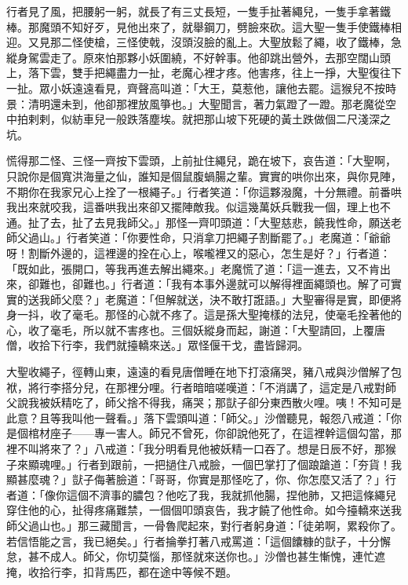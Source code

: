 行者見了風，把腰躬一躬，就長了有三丈長短，一隻手扯著繩兒，一隻手拿著鐵棒。那魔頭不知好歹，見他出來了，就舉鋼刀，劈臉來砍。這大聖一隻手使鐵棒相迎。又見那二怪使槍，三怪使戟，沒頭沒臉的亂上。大聖放鬆了繩，收了鐵棒，急縱身駕雲走了。原來怕那夥小妖圍繞，不好幹事。他卻跳出營外，去那空闊山頭上，落下雲，雙手把繩盡力一扯，老魔心裡才疼。他害疼，往上一掙，大聖復往下一扯。眾小妖遠遠看見，齊聲高叫道：「大王，莫惹他，讓他去罷。這猴兒不按時景：清明還未到，他卻那裡放風箏也。」大聖聞言，著力氣蹬了一蹬。那老魔從空中拍剌剌，似紡車兒一般跌落塵埃。就把那山坡下死硬的黃土跌做個二尺淺深之坑。

慌得那二怪、三怪一齊按下雲頭，上前扯住繩兒，跪在坡下，哀告道：「大聖啊，只說你是個寬洪海量之仙，誰知是個鼠腹蝸腸之輩。實實的哄你出來，與你見陣，不期你在我家兄心上拴了一根繩子。」行者笑道：「你這夥潑魔，十分無禮。前番哄我出來就咬我，這番哄我出來卻又擺陣敵我。似這幾萬妖兵戰我一個，理上也不通。扯了去，扯了去見我師父。」那怪一齊叩頭道：「大聖慈悲，饒我性命，願送老師父過山。」行者笑道：「你要性命，只消拿刀把繩子割斷罷了。」老魔道：「爺爺呀！割斷外邊的，這裡邊的拴在心上，喉嚨裡又的惡心，怎生是好？」行者道：「既如此，張開口，等我再進去解出繩來。」老魔慌了道：「這一進去，又不肯出來，卻難也，卻難也。」行者道：「我有本事外邊就可以解得裡面繩頭也。解了可實實的送我師父麼？」老魔道：「但解就送，決不敢打誑語。」大聖審得是實，即便將身一抖，收了毫毛。那怪的心就不疼了。這是孫大聖掩樣的法兒，使毫毛拴著他的心，收了毫毛，所以就不害疼也。三個妖縱身而起，謝道：「大聖請回，上覆唐僧，收拾下行李，我們就擡轎來送。」眾怪偃干戈，盡皆歸洞。

大聖收繩子，徑轉山東，遠遠的看見唐僧睡在地下打滾痛哭，豬八戒與沙僧解了包袱，將行李搭分兒，在那裡分哩。行者暗暗嗟嘆道：「不消講了，這定是八戒對師父說我被妖精吃了，師父捨不得我，痛哭；那獃子卻分東西散火哩。咦！不知可是此意？且等我叫他一聲看。」落下雲頭叫道：「師父。」沙僧聽見，報怨八戒道：「你是個棺材座子——專一害人。師兄不曾死，你卻說他死了，在這裡幹這個勾當，那裡不叫將來了？」八戒道：「我分明看見他被妖精一口吞了。想是日辰不好，那猴子來顯魂哩。」行者到跟前，一把撾住八戒臉，一個巴掌打了個踉蹌道：「夯貨！我顯甚麼魂？」獃子侮著臉道：「哥哥，你實是那怪吃了，你、你怎麼又活了？」行者道：「像你這個不濟事的膿包？他吃了我，我就抓他腸，捏他肺，又把這條繩兒穿住他的心，扯得疼痛難禁，一個個叩頭哀告，我才饒了他性命。如今擡轎來送我師父過山也。」那三藏聞言，一骨魯爬起來，對行者躬身道：「徒弟啊，累殺你了。若信悟能之言，我已絕矣。」行者掄拳打著八戒罵道：「這個饢糠的獃子，十分懈怠，甚不成人。師父，你切莫惱，那怪就來送你也。」沙僧也甚生慚愧，連忙遮掩，收拾行李，扣背馬匹，都在途中等候不題。

